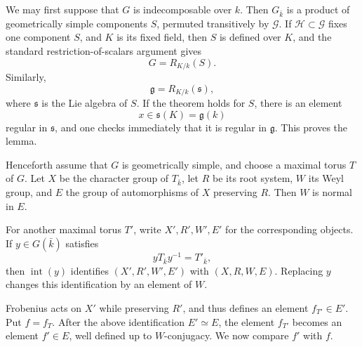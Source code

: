 We may first suppose that \(G\) is indecomposable over \(k\).
Then \(G_{\bar k}\) is a product of geometrically simple
components \(S\), permuted transitively by \(\mathcal G\). If
\(\mathcal H\subset\mathcal G\) fixes one component \(S\), and
\(K\) is its fixed field, then \(S\) is defined over \(K\), and
the standard restriction-of-scalars argument gives
\[
  G=R_{K/k}(S).
\]
Similarly,
\[
  \mathfrak g=R_{K/k}(\mathfrak s),
\]
where \(\mathfrak s\) is the Lie algebra of \(S\). If the theorem
holds for \(S\), there is an element
\[
  x\in\mathfrak s(K)=\mathfrak g(k)
\]
regular in \(\mathfrak s\), and one checks immediately that it
is regular in \(\mathfrak g\). This proves the lemma.

Henceforth assume that \(G\) is geometrically simple, and choose
a maximal torus \(T\) of \(G\). Let \(X\) be the character group
of \(T_{\bar k}\), let \(R\) be its root system, \(W\) its Weyl
group, and \(E\) the group of automorphisms of \(X\) preserving
\(R\). Then \(W\) is normal in \(E\).

For another maximal torus \(T'\), write \(X',R',W',E'\) for the
corresponding objects. If
\(y\in G(\bar k)\) satisfies
\[
  yT_{\bar k}y^{-1}=T'_{\bar k},
\]
then \(\operatorname{int}(y)\) identifies
\((X',R',W',E')\) with \((X,R,W,E)\). Replacing \(y\) changes
this identification by an element of \(W\).

Frobenius acts on \(X'\) while preserving \(R'\), and thus
defines an element \(f_{T'}\in E'\). Put \(f=f_T\). After the
above identification \(E'\simeq E\), the element \(f_{T'}\)
becomes an element \(f'\in E\), well defined up to
\(W\)-conjugacy. We now compare \(f'\) with \(f\).
